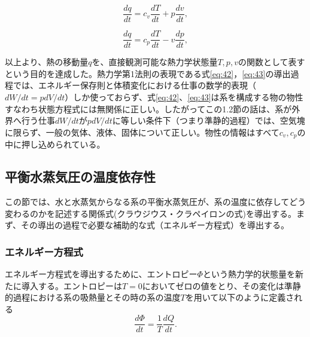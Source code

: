 \documentclass{ltjsarticle}
\begin{document}
\begin{equation}\label{eq:42}
 \frac{dq}{dt}=c_{v}\frac{dT}{dt}+p\frac{dv}{dt},
\end{equation}

\begin{equation}\label{eq:43}
 \frac{dq}{dt}=c_{p}\frac{dT}{dt}-v\frac{dp}{dt},
\end{equation}

以上より、熱の移動量$q$を、直接観測可能な熱力学状態量$T, p, v$の関数として表すという目的を達成した。熱力学第1法則の表現である式\eqref{eq:42}，\eqref{eq:43}の導出過程では、エネルギー保存則と体積変化における仕事の数学的表現（$dW/dt = pdV/dt$）しか使っておらず、式\eqref{eq:42}、\eqref{eq:43}は系を構成する物の物性すなわち状態方程式には無関係に正しい。したがってこの1.2節の話は、系が外界へ行う仕事$dW/dt$が$pdV/dt$に等しい条件下（つまり準静的過程）では、空気塊に限らず、一般の気体、液体、固体について正しい。物性の情報はすべて$c_{v}, c_{p}$の中に押し込められている。

\subsection{平衡水蒸気圧の温度依存性}
この節では、水と水蒸気からなる系の平衡水蒸気圧が、系の温度に依存してどう変わるのかを記述する関係式(クラウジウス・クラペイロンの式)を導出する。まず、その導出の過程で必要な補助的な式（エネルギー方程式）を導出する。
\subsubsection{エネルギー方程式}
エネルギー方程式を導出するために、エントロピー$\Phi$という熱力学的状態量を新たに導入する。エントロピーは$T=0$においてゼロの値をとり、その変化は準静的過程における系の吸熱量とその時の系の温度$T$を用いて以下のように定義される
\begin{equation}\label{eq:44}
 \frac{d\Phi}{dt}=\frac{1}{T}\frac{dQ}{dt}.
\end{equation}
\end{document}
